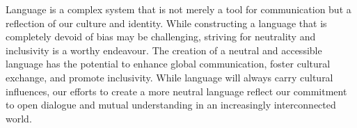 Language is a complex system that is not merely a tool for communication but a reflection of our culture and identity. While constructing a language that is completely devoid of bias may be challenging, striving for neutrality and inclusivity is a worthy endeavour. The creation of a neutral and accessible language has the potential to enhance global communication, foster cultural exchange, and promote inclusivity. While language will always carry cultural influences, our efforts to create a more neutral language reflect our commitment to open dialogue and mutual understanding in an increasingly interconnected world. 

\vfill
